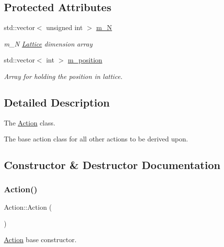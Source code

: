 \subsection*{Protected Attributes}
\begin{DoxyCompactItemize}
\item 
std\+::vector$<$ unsigned int $>$ \mbox{\hyperlink{class_action_a80654d2311707f24689cd9e480edb2f6}{m\+\_\+N}}
\begin{DoxyCompactList}\small\item\em m\+\_\+N \mbox{\hyperlink{class_lattice}{Lattice}} dimension array \end{DoxyCompactList}\item 
std\+::vector$<$ int $>$ \mbox{\hyperlink{class_action_a133fd17c83db233423855178bc81fb16}{m\+\_\+position}}
\begin{DoxyCompactList}\small\item\em Array for holding the position in lattice. \end{DoxyCompactList}\end{DoxyCompactItemize}


\subsection{Detailed Description}
The \mbox{\hyperlink{class_action}{Action}} class. 

The base action class for all other actions to be derived upon. 

\subsection{Constructor \& Destructor Documentation}
\mbox{\label{class_action_a4f457ccfc8336b565cadca56b36e0271}} 
\subsubsection{\texorpdfstring{Action()}{Action()}}
{\footnotesize\ttfamily Action\+::\+Action (\begin{DoxyParamCaption}{ }\end{DoxyParamCaption})}



\mbox{\hyperlink{class_action}{Action}} base constructor. 

